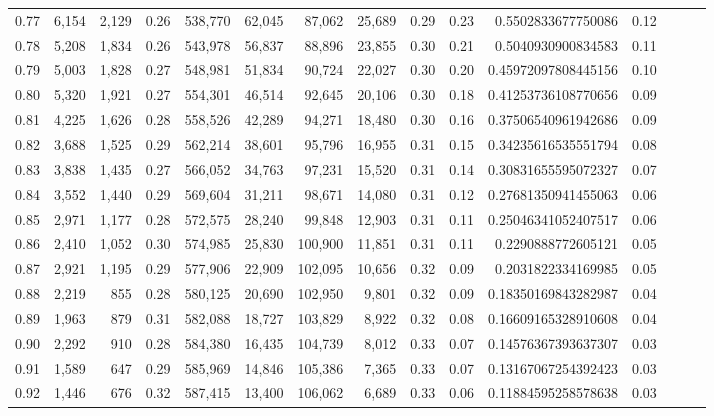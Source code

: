 \begin{tabular}{rrrrrrrrrrrrrrr}
0.77 &   6,154 &  2,129 &  0.26 &  538,770 &   62,045 &   87,062 &   25,689 &  0.29 &  0.23 &    0.5502833677750086 &      0.12 \\
0.78 &   5,208 &  1,834 &  0.26 &  543,978 &   56,837 &   88,896 &   23,855 &  0.30 &  0.21 &    0.5040930900834583 &      0.11 \\
0.79 &   5,003 &  1,828 &  0.27 &  548,981 &   51,834 &   90,724 &   22,027 &  0.30 &  0.20 &   0.45972097808445156 &      0.10 \\
0.80 &   5,320 &  1,921 &  0.27 &  554,301 &   46,514 &   92,645 &   20,106 &  0.30 &  0.18 &   0.41253736108770656 &      0.09 \\
0.81 &   4,225 &  1,626 &  0.28 &  558,526 &   42,289 &   94,271 &   18,480 &  0.30 &  0.16 &   0.37506540961942686 &      0.09 \\
0.82 &   3,688 &  1,525 &  0.29 &  562,214 &   38,601 &   95,796 &   16,955 &  0.31 &  0.15 &   0.34235616535551794 &      0.08 \\
0.83 &   3,838 &  1,435 &  0.27 &  566,052 &   34,763 &   97,231 &   15,520 &  0.31 &  0.14 &   0.30831655595072327 &      0.07 \\
0.84 &   3,552 &  1,440 &  0.29 &  569,604 &   31,211 &   98,671 &   14,080 &  0.31 &  0.12 &   0.27681350941455063 &      0.06 \\
0.85 &   2,971 &  1,177 &  0.28 &  572,575 &   28,240 &   99,848 &   12,903 &  0.31 &  0.11 &   0.25046341052407517 &      0.06 \\
0.86 &   2,410 &  1,052 &  0.30 &  574,985 &   25,830 &  100,900 &   11,851 &  0.31 &  0.11 &    0.2290888772605121 &      0.05 \\
0.87 &   2,921 &  1,195 &  0.29 &  577,906 &   22,909 &  102,095 &   10,656 &  0.32 &  0.09 &    0.2031822334169985 &      0.05 \\
0.88 &   2,219 &    855 &  0.28 &  580,125 &   20,690 &  102,950 &    9,801 &  0.32 &  0.09 &   0.18350169843282987 &      0.04 \\
0.89 &   1,963 &    879 &  0.31 &  582,088 &   18,727 &  103,829 &    8,922 &  0.32 &  0.08 &   0.16609165328910608 &      0.04 \\
0.90 &   2,292 &    910 &  0.28 &  584,380 &   16,435 &  104,739 &    8,012 &  0.33 &  0.07 &   0.14576367393637307 &      0.03 \\
0.91 &   1,589 &    647 &  0.29 &  585,969 &   14,846 &  105,386 &    7,365 &  0.33 &  0.07 &   0.13167067254392423 &      0.03 \\
0.92 &   1,446 &    676 &  0.32 &  587,415 &   13,400 &  106,062 &    6,689 &  0.33 &  0.06 &   0.11884595258578638 &      0.03 \\

\end{tabular}
